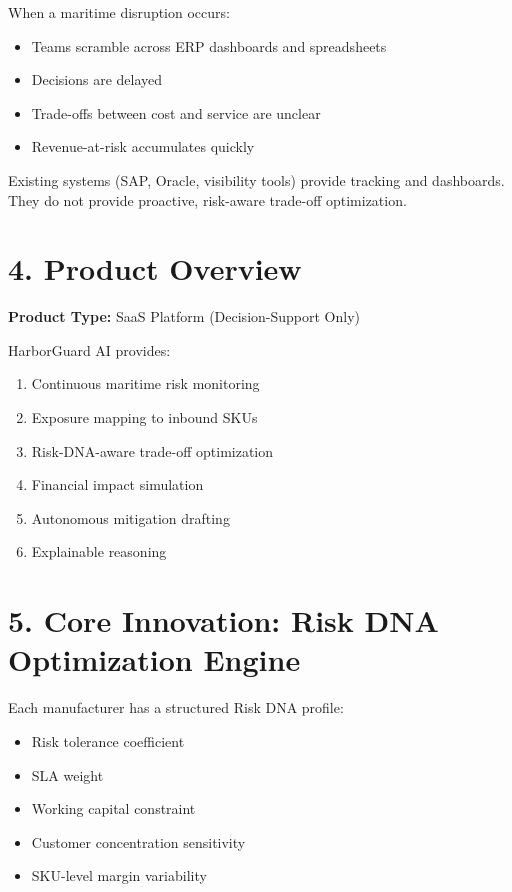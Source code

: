 \documentclass[11pt]{article}
\begin{document}
When a maritime disruption occurs:

\begin{itemize}
    \item Teams scramble across ERP dashboards and spreadsheets
    \item Decisions are delayed
    \item Trade-offs between cost and service are unclear
    \item Revenue-at-risk accumulates quickly
\end{itemize}

Existing systems (SAP, Oracle, visibility tools) provide tracking and dashboards. They do not provide proactive, risk-aware trade-off optimization.

\section*{4. Product Overview}

\textbf{Product Type:} SaaS Platform (Decision-Support Only)

HarborGuard AI provides:

\begin{enumerate}
    \item Continuous maritime risk monitoring
    \item Exposure mapping to inbound SKUs
    \item Risk-DNA-aware trade-off optimization
    \item Financial impact simulation
    \item Autonomous mitigation drafting
    \item Explainable reasoning
\end{enumerate}

\section*{5. Core Innovation: Risk DNA Optimization Engine}

Each manufacturer has a structured Risk DNA profile:

\begin{itemize}
    \item Risk tolerance coefficient
    \item SLA weight
    \item Working capital constraint
    \item Customer concentration sensitivity
    \item SKU-level margin variability
\end{itemize}
\end{document}
